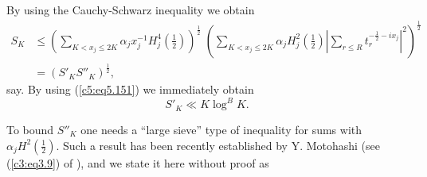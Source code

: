 By using the Cauchy-Schwarz inequality we obtain
\begin{align*}
S_K &\leq \left( \sum\limits_{K < x_j \leq 2 K} \alpha_j x^{-1}_j
H^{4}_j \left(\frac{1}{2} \right)\right)^{\frac{1}{2}} \;
\left(\sum\limits_{K < x_j \leq 2 K} \alpha_j H^2_j \left(\frac{1}{2}
\right) \left| \sum\limits_{r \leq R} t^{-\frac{1}{2} - i x_j}_r
\right|^2 \right)^{\frac{1}{2}}\\ 
&= (S'_K S''_K)^{\frac{1}{2}},
\end{align*}\pageoriginale
say. By using (\ref{c5:eq5.151}) we immediately obtain
$$
S'_K \ll K \log^B K.
$$

To bound $S''_K$ one needs a ``large sieve'' type of inequality for
sums with $\alpha_j H^2 (\frac{1}{2})$. Such a result has been
recently established by Y. Motohashi (see (\ref{c3:eq3.9}) of
\cite{Motohashi7}), and we state it here without proof as 

